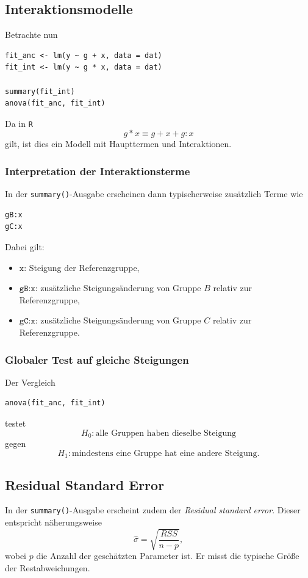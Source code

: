 \documentclass[10pt, letterpaper]{article}
\begin{document}
\subsection{Interaktionsmodelle}

Betrachte nun
\begin{verbatim}
fit_anc <- lm(y ~ g + x, data = dat)
fit_int <- lm(y ~ g * x, data = dat)

summary(fit_int)
anova(fit_anc, fit_int)
\end{verbatim}
Da in \texttt{R}
\[
g*x \equiv g + x + g:x
\]
gilt, ist dies ein Modell mit Haupttermen und Interaktionen.

\subsubsection{Interpretation der Interaktionsterme}

In der \texttt{summary()}-Ausgabe erscheinen dann typischerweise zusätzlich Terme wie
\begin{verbatim}
gB:x
gC:x
\end{verbatim}
Dabei gilt:
\begin{itemize}
    \item \(\texttt{x}\): Steigung der Referenzgruppe,
    \item \(\texttt{gB:x}\): zusätzliche Steigungsänderung von Gruppe \(B\) relativ zur Referenzgruppe,
    \item \(\texttt{gC:x}\): zusätzliche Steigungsänderung von Gruppe \(C\) relativ zur Referenzgruppe.
\end{itemize}

\subsubsection{Globaler Test auf gleiche Steigungen}

Der Vergleich
\begin{verbatim}
anova(fit_anc, fit_int)
\end{verbatim}
testet
\[
H_0:\text{alle Gruppen haben dieselbe Steigung}
\]
gegen
\[
H_1:\text{mindestens eine Gruppe hat eine andere Steigung.}
\]

\subsection{Residual Standard Error}

In der \texttt{summary()}-Ausgabe erscheint zudem der \emph{Residual standard error}. Dieser entspricht näherungsweise
\[
\hat\sigma=\sqrt{\frac{RSS}{n-p}},
\]
wobei \(p\) die Anzahl der geschätzten Parameter ist. Er misst die typische Größe der Restabweichungen.
\end{document}
